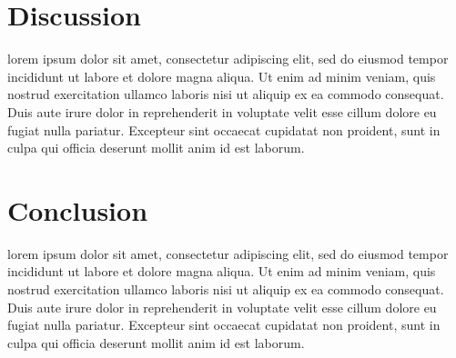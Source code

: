 \documentclass[conference]{IEEEtran}
\begin{document}
\section{Discussion}
lorem ipsum dolor sit amet, consectetur adipiscing elit, sed do eiusmod tempor incididunt ut labore et dolore magna aliqua. Ut enim ad minim veniam, quis nostrud exercitation ullamco laboris nisi ut aliquip ex ea commodo consequat. Duis aute irure dolor in reprehenderit in voluptate velit esse cillum dolore eu fugiat nulla pariatur. Excepteur sint occaecat cupidatat non proident, sunt in culpa qui officia deserunt mollit anim id est laborum.

\section{Conclusion}
lorem ipsum dolor sit amet, consectetur adipiscing elit, sed do eiusmod tempor incididunt ut labore et dolore magna aliqua. Ut enim ad minim veniam, quis nostrud exercitation ullamco laboris nisi ut aliquip ex ea commodo consequat. Duis aute irure dolor in reprehenderit in voluptate velit esse cillum dolore eu fugiat nulla pariatur. Excepteur sint occaecat cupidatat non proident, sunt in culpa qui officia deserunt mollit anim id est laborum.




\end{document}
